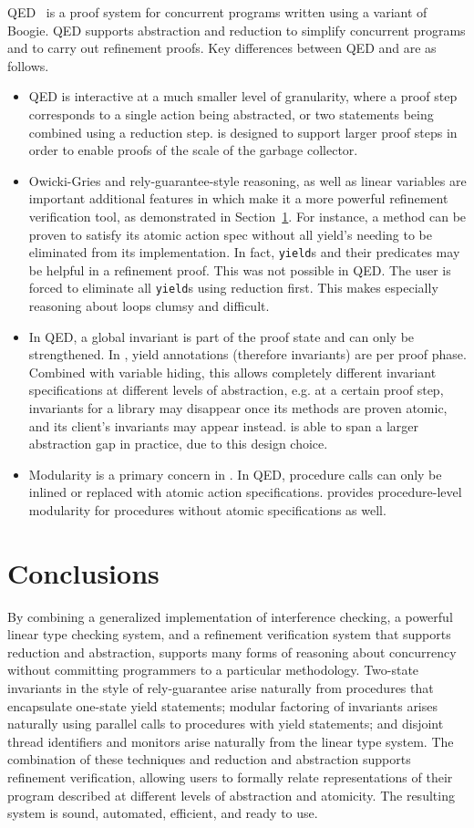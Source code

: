 QED~\cite{QEDRef} is a proof system for concurrent programs written using a variant of Boogie. QED supports abstraction and reduction to simplify concurrent programs and to carry out refinement proofs. Key differences between QED and \civl are as follows.
\begin{itemize}
\item QED is interactive at a much smaller level of granularity, where a proof step corresponds to a single action being abstracted, or two statements being combined using a reduction step. \civl is designed to support larger proof steps in order to enable proofs of the scale of the garbage collector.  
\item Owicki-Gries and rely-guarantee-style reasoning, as well as linear variables are important additional features in \civl which make it a more powerful refinement verification tool, as demonstrated in Section~\ref{}. For instance, a method can be proven to satisfy its atomic action spec without all yield's needing to be eliminated from its implementation. In fact, {\tt yield}s and their predicates may be helpful in a refinement proof. This was not possible in QED. The user is forced to eliminate all {\tt yield}s using reduction first. This makes especially reasoning about loops clumsy and difficult.
\item In QED, a global invariant is part of the proof state and can only be strengthened. In \civl, yield annotations (therefore invariants) are per proof phase. Combined with variable hiding, this allows completely different invariant specifications at different levels of abstraction, e.g. at a certain proof step, invariants for a library may disappear once its methods are proven atomic, and its client's invariants may appear instead. \civl is able to span a larger abstraction gap in practice, due to this design choice.
\item Modularity is a primary concern in \civl. In QED, procedure calls can only be inlined or replaced with atomic action specifications. \civl provides procedure-level modularity for procedures without atomic specifications as well.  
\end{itemize}

\section{Conclusions}

By combining a generalized implementation of interference checking, a powerful linear type checking system, and a refinement verification system that supports reduction and abstraction, 
\civl supports many forms of reasoning about concurrency without committing programmers to a particular methodology.
Two-state invariants in the style of rely-guarantee arise naturally from procedures that encapsulate one-state yield statements;
modular factoring of invariants arises naturally using parallel calls to procedures with yield statements;
and disjoint thread identifiers and monitors arise naturally from the linear type system. The combination of these techniques and reduction and abstraction supports refinement verification, allowing users to formally relate representations of their program described at different levels of abstraction and atomicity. 
The resulting system is sound, automated, efficient, and ready to use.

